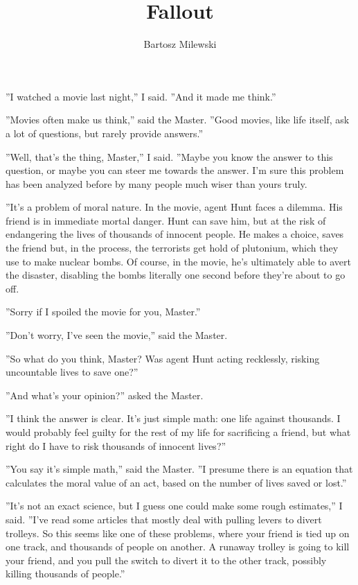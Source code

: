 \documentclass{memoir}
\author{Bartosz Milewski}
\title{Fallout}
\date{}
\begin{document}
\maketitle{}
''I watched a movie last night,'' I said. ''And it made me think.''

''Movies often make us think,'' said the Master. ''Good movies, like life itself, ask a lot of questions, but rarely provide answers.''

''Well, that's the thing, Master,'' I said. ''Maybe you know the answer to this question, or maybe you can steer me towards the answer. I'm sure this problem has been analyzed before by many people much wiser than yours truly.

''It's a problem of moral nature. In the movie, agent Hunt faces a dilemma. His friend is in immediate mortal danger. Hunt can save him, but at the risk of endangering the lives of thousands of innocent people. He makes a choice, saves the friend but, in the process, the terrorists get hold of plutonium, which they use to make nuclear bombs. Of course, in the movie, he's ultimately able to avert the disaster, disabling the bombs literally one second before they're about to go off. 

''Sorry if I spoiled the movie for you, Master.''

''Don't worry, I've seen the movie,'' said the Master.

''So what do you think, Master? Was agent Hunt acting recklessly, risking uncountable lives to save one?''

''And what's your opinion?'' asked the Master.

''I think the answer is clear. It's just simple math: one life against thousands. I would probably feel guilty for the rest of my life for sacrificing a friend, but what right do I have to risk thousands of innocent lives?''

''You say it's simple math,'' said the Master. ''I presume there is an equation that calculates the moral value of an act, based on the number of lives saved or lost.''

''It's not an exact science, but I guess one could make some rough estimates,'' I said. ''I've read some articles that mostly deal with pulling levers to divert trolleys. So this seems like one of these problems, where your friend is tied up on one track, and thousands of people on another. A runaway trolley is going to kill your friend, and you pull the switch to divert it to the other track, possibly killing thousands of people.''
\end{document}

